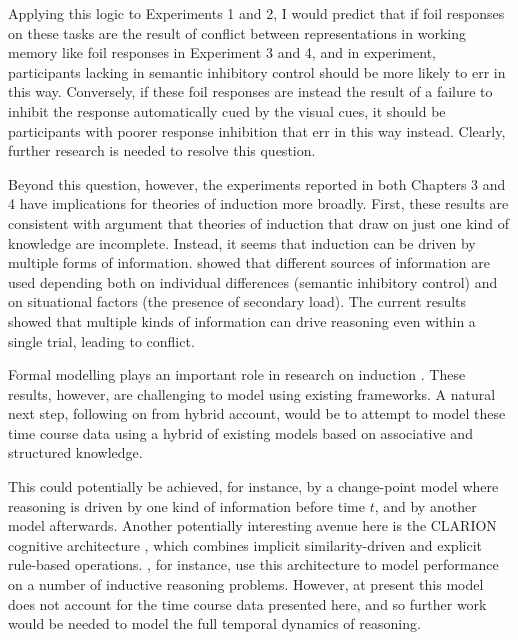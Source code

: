 Applying this logic to Experiments 1 and 2,
I would predict that if foil responses on these tasks
are the result of conflict between representations in working memory
like foil responses in Experiment 3 and 4, and in  experiment,
participants lacking in semantic inhibitory control
should be more likely to err in this way.
Conversely, if these foil responses
are instead the result of a failure to inhibit
the response automatically cued by the visual cues,
it should be participants with poorer response inhibition
that err in this way instead.
Clearly, further research is needed to resolve this question.

Beyond this question, however, the experiments reported in both
Chapters 3 and 4 have implications for theories of induction more broadly.
First, these results are consistent with  argument
that theories of induction that draw on just one kind of knowledge are incomplete.
Instead, it seems that induction can be driven by multiple forms of information.
\citet{Bright2014a} showed that different sources of information are used
depending both on individual differences (semantic inhibitory control)
and on situational factors (the presence of secondary load).
The current results showed that multiple kinds of information
can drive reasoning even within a single trial, leading to conflict.

Formal modelling plays an important role in research on induction
\citep[see, e.g.,][]{Sloman1993,Osherson1990,Kemp2009,Hawkins2015}.
These results, however, are challenging to model using existing frameworks.
A natural next step, following on from  hybrid account,
would be to attempt to model these time course data
using a hybrid of existing models based on associative and structured knowledge.

This could potentially be achieved, for instance,
by a change-point model where reasoning is driven by
one kind of information before time $t$,
and by another model afterwards.
Another potentially interesting avenue here is
the CLARION cognitive architecture \citep[e.g.][]{Sun1995,Sun2006},
which combines implicit similarity-driven
and explicit rule-based operations.
\citet{Sun2006}, for instance, use this architecture
to model performance on a number of inductive reasoning problems.
However,  at present this model does not account for
the time course data presented here,
and so further work would be needed
to model the full temporal dynamics of reasoning.

